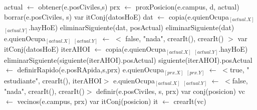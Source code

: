 \begin{algorithm}[H]
\begin{algorithmic}[1]
 
	\State actual $\gets$ obtener(e.posCiviles,s)  
	\State prx $\gets$ proxPosicion(e.campus, d, actual)  
		\State borrar(e.posCiviles, s) 
		\State var itConj(datosHoE) dat $\gets$ copia(e.quienOcupa$_{[actual.X]}$ $_{[actual.Y]}$.hayHoE) 
		\State eliminarSiguiente(dat, posActual) 
		\State eliminarSiguiente(dat) 
		\State e.quienOcupa$_{[actual.X]}$ $_{[actual.Y]}$ $\gets$ $<$ false, "nada", crearIt(), crearIt() $>$ 
	\Else
		\State var itConj(datosHoE) iterAHOI $\gets$ copia(e.quienOcupa$_{[actual.X]}$ $_{[actual.Y]}$.hayHoE) 
		\State eliminarSiguiente(siguiente(iterAHOI).posActual) 
		\State siguiente(iterAHOI).posActual $\gets$ definirRapido(e.posRApida,s,prx) 
		\State e.quienOcupa$_{[prx.X]}$ $_{[prx.Y]}$ $\gets$ $<$true, " estudiante", crearIt(), iterAHOI$>$ 
		\State e.quienOcupa$_{[actual.X]}$ $_{[actual.Y]}$ $\gets$ $<$false, "nada", crearIt(), crearIt()$>$ 
		\State definir(e.posCiviles, s, prx) 
		\State var conj(posicion) vc $\gets$ vecinos(e.campus, prx) 
		\State var itConj(posicion) it $\gets$ crearIt(vc) 
		

\end{algorithmic}
\end{algorithm}
